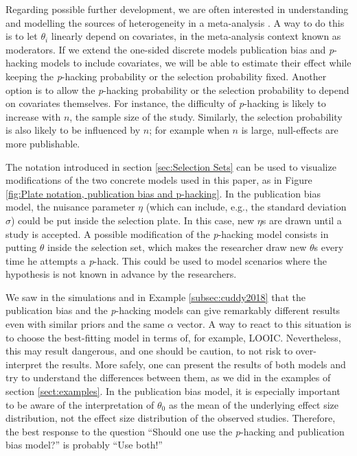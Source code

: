 \documentclass[useAMS,usenatbib,referee]{biom}
\begin{document}
Regarding possible further development, we are often interested in understanding and modelling the sources of heterogeneity in a meta-analysis \citep{thompson1994systematic}. A way to do this is to let $\theta_{i}$ linearly depend on covariates, in the meta-analysis context known as moderators. If we extend the one-sided discrete models publication bias and \textit{p}-hacking models to include covariates, we will be able to estimate their effect while keeping the \textit{p}-hacking probability or the selection probability fixed. Another option is to allow the \textit{p}-hacking probability or the selection probability to depend on covariates themselves. For instance, the difficulty of \textit{p}-hacking is likely to increase with $n$, the sample size of the study. Similarly, the selection probability is also likely to be influenced by $n$; for example when $n$ is large, null-effects are more publishable.

The notation introduced in section \ref{sec:Selection Sets} can be used to visualize modifications of the two concrete models used in this paper, as in Figure \ref{fig:Plate notation, publication bias and p-hacking}. In the publication bias model, the nuisance parameter $\eta$ (which can include, e.g., the standard deviation $\sigma$) could be put inside the selection plate. In this case, new $\eta$s are drawn until a study is accepted. A possible modification of the \textit{p}-hacking model consists in putting $\theta$ inside the selection set, which makes the researcher draw new $\theta$s every time he attempts a \textit{p}-hack. This could be used to model scenarios where the hypothesis is not
known in advance by the researchers.

We saw in the simulations and in Example \ref{subsec:cuddy2018} that the publication bias and the \textit{p}-hacking models can give remarkably different results even with similar priors and the same $\alpha$ vector. A way to react to this situation is to choose the best-fitting model in terms of, for example, LOOIC. Nevertheless, this may result dangerous, and one should be caution, to not risk to over-interpret the results. More safely, one can present the results of both models and try to understand the differences between them, as we did in the examples of section \ref{sect:examples}. In the publication bias model, it is especially important to be aware of the interpretation of $\theta_{0}$ as the mean of the underlying effect size distribution, not the effect size distribution of the observed studies. Therefore, the best response to the question \enquote{Should one use the \textit{p}-hacking and publication bias model?} is probably \enquote{Use both!}
\end{document}
